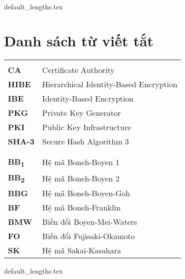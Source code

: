 \documentclass[class=report, crop=false]{standalone}
\begin{document}
	{default_lengths.tex}
	\baselineskip
	\chapter*{Danh sách từ viết tắt}
	\begin{longtabu}{>{\large\bfseries}p{2cm} >{\large}X[l]}
		 \\
		CA						&	Certificate Authority										\\
		HIBE					&	Hierarchical Identity-Based Encryption 						\\
		IBE						&	Identity-Based Encryption 									\\
		PKG						&	Private Key Generator										\\
		PKI						&	Public Key Infrastructure									\\
		SHA-3					&	Secure Hash Algorithm 3										\\
		\\  \\
		BB\textsubscript{1}		& 	Hệ mã Boneh-Boyen 1 \cite{DBLP:journals/joc/BonehB11} 		\\
		BB\textsubscript{2}		& 	Hệ mã Boneh-Boyen 2 \cite{DBLP:journals/joc/BonehB11}		\\
		BBG						& 	Hệ mã Boneh-Boyen-Goh \cite{DBLP:conf/eurocrypt/BonehBG05} 	\\
		BF 						& 	Hệ mã Boneh-Franklin \cite{DBLP:conf/crypto/BonehF01} 		\\
		BMW 					& 	Biến đổi Boyen-Mei-Waters \cite{DBLP:conf/ccs/BoyenMW05} 	\\
		FO 						& 	Biến đổi Fujisaki-Okamoto \cite{DBLP:conf/crypto/FujisakiO99} 	\\
		SK 						& 	Hệ mã Sakai-Kasahara \cite{DBLP:journals/iacr/SakaiK03} 	\\
	\end{longtabu}
	\newpage
	{default_lengths.tex}
\end{document}
